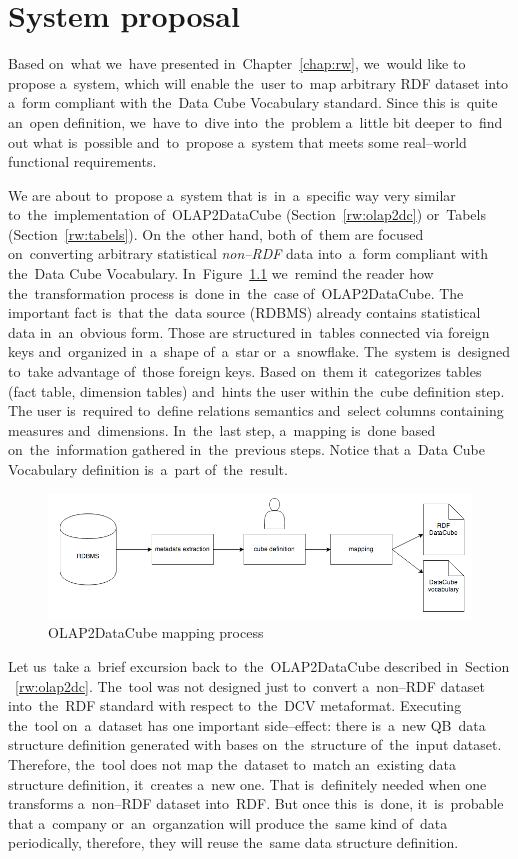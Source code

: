 \chapter{System proposal}
\label{ch:proposal}
Based on~what we~have presented in~Chapter~\ref{chap:rw}, we~would like to
propose a~system, which will enable the~user to~map arbitrary RDF dataset
into a~form compliant with the~Data Cube Vocabulary standard. Since this is~quite an~open definition, we~have to~dive into~the~problem a~little bit deeper to~find out what is~possible and~to~propose a~system that meets some real--world 
functional requirements.

We are about to~propose a~system that is~in~a~specific way very similar to~the~implementation of~OLAP2DataCube (Section~\ref{rw:olap2dc}) or~Tabels (Section~\ref{rw:tabels}).
On the~other hand, both of~them are 
focused on~converting arbitrary statistical \emph{non--RDF} data into~a~form 
compliant with the~Data Cube Vocabulary. In~Figure~\ref{fig:olap2dc-mapping} we~remind
the reader how the~transformation process is~done in~the~case of~OLAP2DataCube.
The important fact is~that the~data source (RDBMS) already contains statistical data in~an~obvious form. 
Those are structured in~tables connected via foreign keys and~organized in~a~shape of~a~star or~a~snowflake. The~system is~designed to~take advantage of~those 
foreign keys. Based on~them it~categorizes tables (fact table, dimension tables) and~hints
the user within the~cube definition step.
The user is~required to~define relations semantics and~select columns 
containing measures and~dimensions. In~the~last step, a~mapping is~done based on~the~information gathered in~the~previous steps.
Notice that a~Data Cube Vocabulary definition is~a~part of~the~result.


\begin{figure}
	\centering
	\includegraphics[width=140mm]{img/mapping-olap2dc.png}
	\caption{OLAP2DataCube mapping process}
	\label{fig:olap2dc-mapping}
\end{figure}


Let us~take a~brief excursion back to~the~OLAP2DataCube described in~Section 
~\ref{rw:olap2dc}. The~tool was not designed just to~convert a~non--RDF dataset 
into~the~RDF standard with respect to~the~DCV metaformat. Executing the~tool on~a~dataset has one important side--effect: there is~a~new QB~data structure definition
generated with bases on~the~structure of~the~input dataset. Therefore, the~tool does not map the~dataset to~match an~existing data structure definition, it~creates a~new one. That is~definitely
needed when one transforms a~non--RDF dataset into~RDF. But once 
this~is~done, it~is~probable that a~company or~an~organzation will produce the~same kind of~data periodically, therefore, they will reuse the~same data structure definition.

